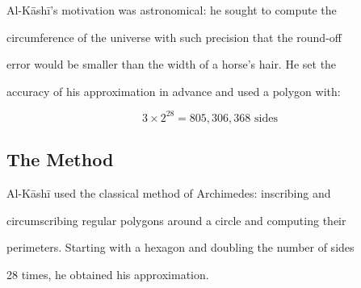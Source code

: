 \documentclass[11pt,a4paper]{article}
\begin{document}
Al-K\=ash\=i's motivation was astronomical: he sought to compute the

circumference of the universe with such precision that the round-off

error would be smaller than the width of a horse's hair. He set the

accuracy of his approximation in advance and used a polygon with:

\[

3 \times 2^{28} = 805{,}306{,}368 \text{ sides}

\]



\subsection{The Method}



Al-K\=ash\=i used the classical method of Archimedes: inscribing and

circumscribing regular polygons around a circle and computing their

perimeters. Starting with a hexagon and doubling the number of sides

28 times, he obtained his approximation.
\end{document}
